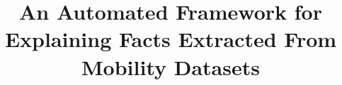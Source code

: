 \documentclass[conference]{IEEEtran}
\title{An Automated Framework for Explaining Facts Extracted From Mobility Datasets}
\author{
\IEEEauthorblockN{Anique Tahir}
\IEEEauthorblockA{
\textit{Arizona State University}\\
Tempe, USA \\
artahir@asu.edu}
\and
\IEEEauthorblockN{Mohamed Sarwat}
\IEEEauthorblockA{
\textit{Arizona State University}\\
Tempe, USA \\
msarwat@asu.edu}
}
\begin{document}
\maketitle






%


\pagebreak
%





 
\end{document}
